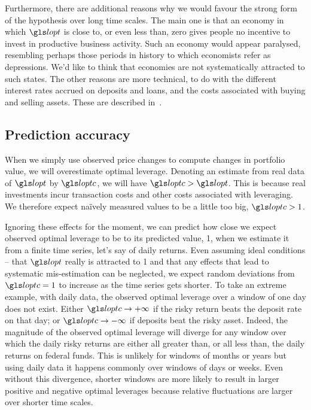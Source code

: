 Furthermore, there are additional reasons why we would favour the strong form of the hypothesis over long time scales. The main one is that an economy in which $\lopt$ is close to, or even less than, zero gives people no incentive to invest in productive business activity. Such an economy would appear paralysed, resembling perhaps those periods in history to which economists refer as depressions. We'd like to think that economies are not systematically attracted to such states. The other reasons are more technical, to do with the different interest rates accrued on deposits and loans, and the costs associated with buying and selling assets. These are described in~\cite{PetersAdamou2011}. 


\subsection{Prediction accuracy}
When we simply use observed price changes to compute changes in portfolio value, we will overestimate optimal leverage. Denoting an estimate from real data of $\lopt$ by $\loptc$, we will  have $\loptc>\lopt$. This is because real investments incur transaction costs and other costs associated with leveraging. We therefore expect na\"ively measured values to be a little too big, $\loptc>1$. 

Ignoring these effects for the moment, we can predict how close we expect observed optimal leverage to be to its predicted value, 1, when we estimate it from a finite time series, let's say of daily returns. Even assuming ideal conditions -- that $\lopt$ really is attracted to 1 and that any effects that lead to systematic mis-estimation can be neglected, we expect random
deviations from $\loptc=1$ to increase as the time series gets shorter. To take an extreme example, with daily data, the observed optimal leverage over a
window of one day does not exist. Either $\loptc \to+\infty$ if the
risky return beats the deposit rate on that day; or $\loptc \to -\infty$ if
deposits beat the risky asset. Indeed, the magnitude of the observed
optimal leverage will diverge for any window over which the daily
risky returns are either all greater than, or all less than, the daily returns on federal
funds. This is unlikely for windows of months or years but using daily data it happens
commonly over windows of days or weeks. Even without this
divergence, shorter windows are more likely to result in larger
positive and negative optimal leverages because relative fluctuations
are larger over shorter time scales.

